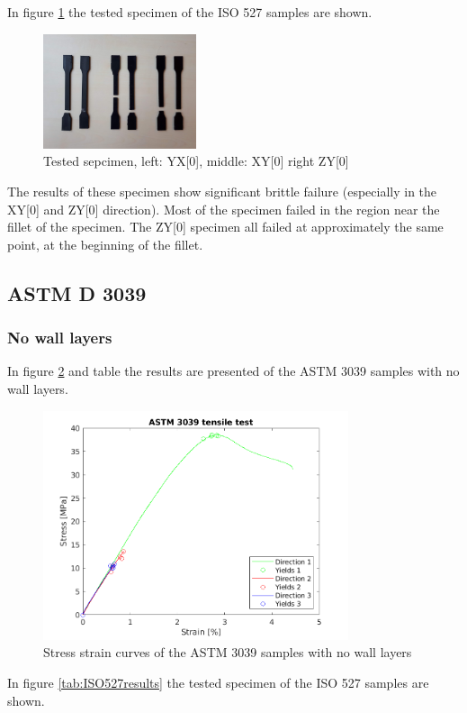 In figure \ref{fig:ISO527specimen} the tested specimen of the ISO 527 samples are shown. 
\begin{figure}[H]
    \centering
    \includegraphics[width=0.40\textwidth]{chapter_5_Experimentaltesting/figures/imageISO.jpg}
    \caption{Tested sepcimen, left: YX[0], middle: XY[0] right ZY[0]}
    \label{fig:ISO527specimen}
\end{figure}
The results of these specimen show significant brittle failure (especially in the XY[0] and ZY[0] direction). Most of the specimen failed in the region near the fillet of the specimen. The ZY[0] specimen all failed at approximately the same point, at the beginning of the fillet. 

\subsection{ASTM D 3039}
\subsubsection{No wall layers }
In figure \ref{fig:ASTM3039results} and table \label{tab:ASTM3039results} the results are presented of the ASTM 3039 samples with no wall layers.
\begin{figure}[H]
    \centering
    \includegraphics[width=0.80\textwidth]{chapter_5_Experimentaltesting/figures/ASTMnoTensiletests.png}
    \caption{Stress strain curves of the ASTM 3039 samples with no wall layers}
    \label{fig:ASTM3039results}
\end{figure}
In figure \ref{tab:ISO527results} the tested specimen of the ISO 527 samples are shown. 

